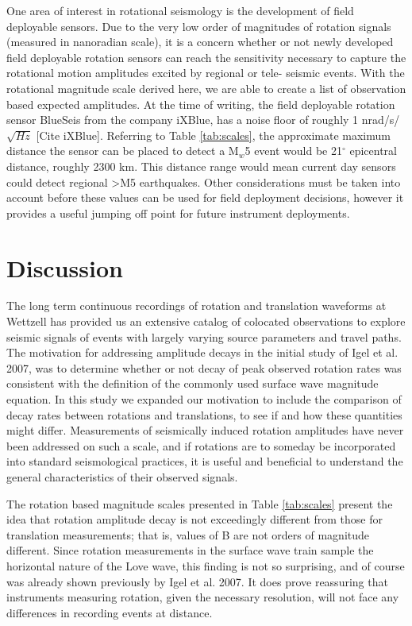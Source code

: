 \documentclass{gji}
\begin{document}
One area of interest in rotational seismology is the development of field deployable sensors. Due to the very low order of magnitudes of rotation signals (measured in nanoradian scale), it is a concern whether or not newly developed field deployable rotation sensors can reach the sensitivity necessary to capture the rotational motion amplitudes excited by regional or tele- seismic events. With the rotational magnitude scale derived here, we are able to create a list of observation based expected amplitudes. At the time of writing, the field deployable rotation sensor BlueSeis from the company iXBlue, has a noise floor of roughly 1 nrad/s/$\sqrt{Hz}$ [Cite iXBlue]. Referring to Table \ref{tab:scales}, the approximate maximum distance the sensor can be placed to detect a M$_w$5 event would be 21$^\circ$ epicentral distance, roughly 2300 km. This distance range would mean current day sensors could detect regional >M5 earthquakes. Other considerations must be taken into account before these values can be used for field deployment decisions, however it provides a useful jumping off point for future instrument deployments.



\section{Discussion}
The long term continuous recordings of rotation and translation waveforms at Wettzell has provided us an extensive catalog of colocated observations to explore seismic signals of events with largely varying source parameters and travel paths. The motivation for addressing amplitude decays in the initial study of Igel et al. 2007, was to determine whether or not decay of peak observed rotation rates was consistent with the definition of the commonly used surface wave magnitude equation. In this study we expanded our motivation to include the comparison of decay rates between rotations and translations, to see if and how these quantities might differ. Measurements of seismically induced rotation amplitudes have never been addressed on such a scale, and  if rotations are to someday be incorporated into standard seismological practices, it is useful and beneficial to understand the general characteristics of their observed signals.

The rotation based magnitude scales presented in Table \ref{tab:scales} present the idea that rotation amplitude decay is not exceedingly different from those for translation measurements; that is, values of B are not orders of magnitude different. Since rotation measurements in the surface wave train sample the horizontal nature of the Love wave, this finding is not so surprising, and of course was already shown previously by Igel et al. 2007. It does prove reassuring that instruments measuring rotation, given the necessary resolution, will not face any differences in recording events at distance.
\end{document}
